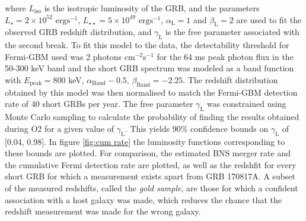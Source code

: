 \documentclass[11pt]{cuthesis}
\begin{document}
where $L_\text{iso}$ is the isotropic luminosity of the GRB, and the parameters $L_{\star} = 2 \times 10^{52} \text{ ergs}^{-1}$, $L_{\star\star}=5 \times 10^{49} \text{ ergs}^{-1}$, $\alpha_\text{L} = 1$ and $\beta_\text{L} = 2$ are used to fit the observed GRB redshift distribution, and $\gamma_\text{L}$ is the free parameter associated with the second break. To fit this model to the data, the detectability threshold for Fermi-GBM used was 2 photons cm$^{-2}$s$^{-1}$ for the 64 ms peak photon flux in the 50-300 keV band and the short GRB spectrum was modeled as a band function with $E_\text{peak}=800$ keV, $\alpha_\text{Band}-0.5$, $\beta_\text{Band} = -2.25$. The redshift distribution obtained by this model was then normalised to match the Fermi-GBM detection rate of 40 short GRBs per year. The free parameter $\gamma_\text{L}$ was constrained using Monte Carlo sampling to calculate the probability of finding the results obtained during O2 for a given value of $\gamma_\text{L}$. This yields 90\% confidence bounds on $\gamma_\text{L}$ of [0.04, 0.98]. In figure \ref{fig:cum rate} the luminosity functions corresponding to these bounds are plotted. For comparison, the estimated BNS merger rate\cite{GW170817_GRB} and the cumulative Fermi detection rate\cite{Howell} are plotted, as well as the redshfit for every short GRB for which a measurement exists apart from GRB 170817A. A subset of the measured redshifts, called the \textit{gold sample}, are those for which a confident association with a host galaxy was made, which reduces the chance that the redshift measurement was made for the wrong galaxy.
\end{document}
